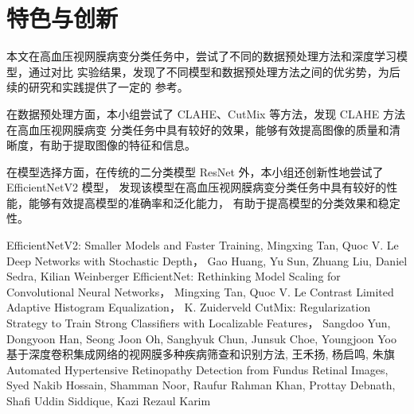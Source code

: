 \documentclass[UTF8,12pt,a4paper]{ctexart}
\begin{document}
\section{特色与创新}
本文在高血压视网膜病变分类任务中，尝试了不同的数据预处理方法和深度学习模型，通过对比
实验结果，发现了不同模型和数据预处理方法之间的优劣势，为后续的研究和实践提供了一定的
参考。

在数据预处理方面，本小组尝试了 CLAHE、CutMix 等方法，发现 CLAHE 方法在高血压视网膜病变
分类任务中具有较好的效果，能够有效提高图像的质量和清晰度，有助于提取图像的特征和信息。

在模型选择方面，在传统的二分类模型 ResNet 外，本小组还创新性地尝试了 EfficientNetV2 模型，
发现该模型在高血压视网膜病变分类任务中具有较好的性能，能够有效提高模型的准确率和泛化能力，
有助于提高模型的分类效果和稳定性。

\begin{thebibliography}{9}
	EfficientNetV2: Smaller Models and Faster Training, Mingxing Tan, Quoc V. Le
	Deep Networks with Stochastic Depth， Gao Huang, Yu Sun, Zhuang Liu, Daniel Sedra, Kilian Weinberger
	EfficientNet: Rethinking Model Scaling for Convolutional Neural Networks， Mingxing Tan, Quoc V. Le
	Contrast Limited Adaptive Histogram Equalization， K. Zuiderveld
	CutMix: Regularization Strategy to Train Strong Classifiers with Localizable Features， Sangdoo Yun, Dongyoon Han, Seong Joon Oh, Sanghyuk Chun, Junsuk Choe, Youngjoon Yoo
	基于深度卷积集成网络的视网膜多种疾病筛查和识别方法, 王禾扬, 杨启鸣, 朱旗
	Automated Hypertensive Retinopathy Detection from Fundus Retinal Images, Syed Nakib Hossain, Shamman Noor, Raufur Rahman Khan, Prottay Debnath, Shafi Uddin Siddique,
Kazi Rezaul Karim
\end{thebibliography}
\end{document}
